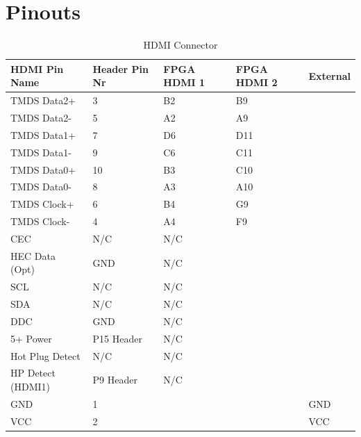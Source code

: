 \chapter{Pinouts}
\label{app:pinouts}
\begin{table}[h]
    \centering
    \begin{tabular}{lllll}
        HDMI Pin Name            & Header Pin Nr & FPGA HDMI 1 & FPGA HDMI 2 & External \\
        \hline
        TMDS Data2+              & 3             & B2              & B9              &          \\
        TMDS Data2-              & 5             & A2              & A9              &          \\
        TMDS Data1+              & 7             & D6              & D11             &          \\
        TMDS Data1-              & 9             & C6              & C11             &          \\
        TMDS Data0+              & 10            & B3              & C10             &          \\
        TMDS Data0-              & 8             & A3              & A10             &          \\
        TMDS Clock+              & 6             & B4              & G9              &          \\
        TMDS Clock-              & 4             & A4              & F9              &          \\
        CEC                      & N/C           & N/C             &                 &          \\
        HEC Data (Opt)           & GND           & N/C             &                 &          \\
        SCL                      & N/C           & N/C             &                 &          \\
        SDA                      & N/C           & N/C             &                 &          \\
        DDC                      & GND           & N/C             &                 &          \\
        5+ Power                 & P15 Header    & N/C             &                 &          \\
        Hot Plug Detect          & N/C           & N/C             &                 &          \\
        HP Detect (HDMI1) & P9 Header     & N/C             &                 &          \\
        GND & 1             &                 &                 & GND      \\
        VCC & 2             &                 &                 & VCC      \\
    \end{tabular}
    \caption{HDMI Connector}
    \label{HDMI_Connector}
\end{table}

